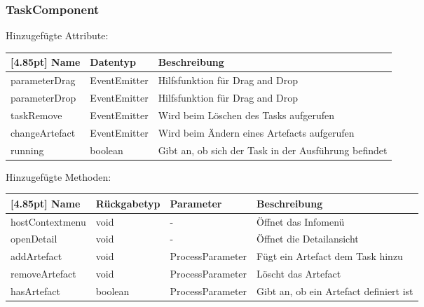     	 \subsubsection{TaskComponent}
			Hinzugefügte Attribute:
			\begin{center}
				\setlength\tabcolsep{5pt}
				\renewcommand{\arraystretch}{1.5}
				
				\begin{tabularx}{\textwidth}{|l|l|X|}
					\hline
					\rowcolor[gray]{0.90}[4.85pt]
					Name & Datentyp & Beschreibung \\ \hline 
					parameterDrag & EventEmitter & Hilfsfunktion für Drag and Drop \\ \hline
					parameterDrop & EventEmitter & Hilfsfunktion für Drag and Drop \\ \hline
                    taskRemove & EventEmitter & Wird beim Löschen des Tasks aufgerufen \\ \hline
					changeArtefact & EventEmitter & Wird beim Ändern eines Artefacts aufgerufen \\ \hline
					running & boolean & Gibt an, ob sich der Task in der Ausführung befindet \\ \hline
				\end{tabularx}
			\end{center}
			Hinzugefügte Methoden:
			\begin{center}
    			\setlength\tabcolsep{5pt}
    			\renewcommand{\arraystretch}{1.5}
    			\begin{tabularx}{\textwidth}{|l|l|l|X|}
    				\hline
    				\rowcolor[gray]{0.90}[4.85pt]
    				Name & Rückgabetyp & Parameter & Beschreibung \\ \hline

    				hostContextmenu & void & - & Öffnet das Infomenü \\ \hline
    				openDetail & void & - & Öffnet die Detailansicht \\ \hline
    				addArtefact & void & ProcessParameter & Fügt ein Artefact dem Task hinzu \\ \hline
    				removeArtefact & void & ProcessParameter & Löscht das Artefact \\ \hline
    				hasArtefact & boolean & ProcessParameter & Gibt an, ob ein Artefact definiert ist \\ \hline
    			 \hline
    			\end{tabularx}
		    \end{center}
		    
    \newpage
    

